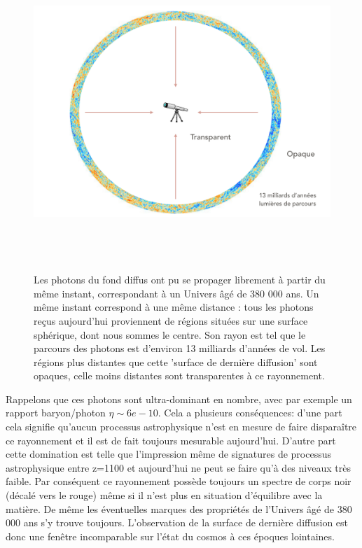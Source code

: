 \begin{figure}[htbp]
	\centering
		\includegraphics[height=12cm]{figs/LSS.png}
	\caption{Les photons du fond diffus ont pu se propager librement à partir du même instant, correspondant à un Univers âgé de 380 000 ans. Un même instant correspond à une même distance : tous les photons reçus aujourd'hui proviennent de régions situées sur une surface sphérique, dont nous sommes le centre. Son rayon est tel que le parcours des photons est d'environ 13 milliards d'années de vol. Les régions plus distantes que cette 'surface de dernière diffusion' sont opaques, celle moins distantes sont transparentes à ce rayonnement.}
	\label{f:LSS}
\end{figure}

Rappelons que ces photons sont ultra-dominant en nombre, avec par exemple un rapport baryon/photon $\eta\sim6e-10$. Cela a plusieurs conséquences: d'une part cela signifie qu'aucun processus astrophysique n'est en mesure de faire disparaître ce rayonnement et il est de fait toujours mesurable aujourd'hui. D'autre part cette domination est telle que l'impression même de signatures de processus astrophysique entre z=1100 et aujourd'hui ne peut se faire qu'à des niveaux très faible. Par conséquent ce rayonnement possède toujours un spectre de corps noir (décalé vers le rouge) même si il n'est plus en situation d'équilibre avec la matière. De même les éventuelles marques des propriétés de l'Univers âgé de 380 000 ans s'y trouve toujours. L'observation de la surface de dernière diffusion est donc une fenêtre incomparable sur l'état du cosmos à ces époques lointaines.




